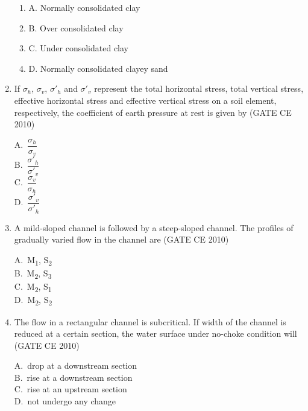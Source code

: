 \documentclass[journal,12pt,onecolumn]{exam}
\theoremstyle{remark}
\begin{document}
\begin{enumerate}
\begin{enumerate}[label=]
\item A. Normally consolidated clay \\
\item B. Over consolidated clay \\
\item C. Under consolidated clay \\
\item D. Normally consolidated clayey sand
\end{enumerate}

\setlength{\parindent}{0pt}
\setlength{\parskip}{0.5cm}

\raggedright


\noindent\item If $\sigma_h$, $\sigma_v$, $\sigma'_h$ and $\sigma'_v$ represent the total horizontal stress, total vertical stress, effective horizontal stress and effective vertical stress on a soil element, respectively, the coefficient of earth pressure at rest is given by
\hfill{(GATE CE 2010)}
\begin{multicols}{4}
A.\ $\dfrac{\sigma_h}{\sigma_v}$ \\
B.\ $\dfrac{\sigma'_h}{\sigma'_v}$ \\
C.\ $\dfrac{\sigma_v}{\sigma_h}$ \\
D.\ $\dfrac{\sigma'_v}{\sigma'_h}$
\end{multicols}

\noindent\item A mild-sloped channel is followed by a steep-sloped channel. The profiles of gradually varied flow in the channel are
\hfill{(GATE CE 2010)}
\begin{multicols}{4}
A.\ M\textsubscript{1}, S\textsubscript{2} \\
B.\ M\textsubscript{2}, S\textsubscript{3} \\
C.\ M\textsubscript{2}, S\textsubscript{1} \\
D.\ M\textsubscript{2}, S\textsubscript{2}
\end{multicols}

\noindent\item The flow in a rectangular channel is subcritical. If width of the channel is reduced at a certain section, the water surface under no-choke condition will
\hfill{(GATE CE 2010)}
\begin{multicols}{4}
A.\ drop at a downstream section \\
B.\ rise at a downstream section \\
C.\ rise at an upstream section \\
D.\ not undergo any change
\end{multicols}


\end{enumerate}
\end{document}
